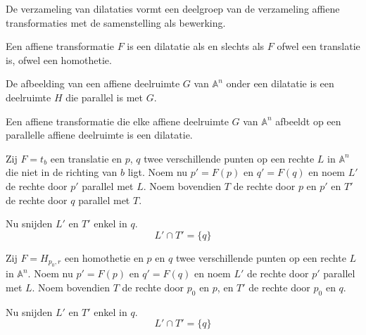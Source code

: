 \documentclass[main.tex]{subfiles}
\begin{document}
\begin{st}
  De verzameling van dilataties vormt een deelgroep van de verzameling affiene transformaties met de samenstelling als bewerking.
\end{st}

\begin{st}
  Een affiene transformatie $F$ is een dilatatie als en slechts als $F$ ofwel een translatie is, ofwel een homothetie.

\end{st}

\begin{st}
  De afbeelding van een affiene deelruimte $G$ van $\mathbb{A}^{n}$ onder een dilatatie is een deelruimte $H$ die parallel is met $G$.

\end{st}

\begin{st}
  Een affiene transformatie die elke affiene deelruimte $G$ van $\mathbb{A}^{n}$ afbeeldt op een parallelle affiene deelruimte is een dilatatie.

\end{st}

\begin{lem}
  Zij $F = t_{b}$ een translatie en $p$, $q$ twee verschillende punten op een rechte $L$ in $\mathbb{A}^{n}$ die niet in de richting van $b$ ligt.
  Noem nu $p' = F(p)$ en $q'= F(q)$ en noem $L'$ de rechte door $p'$ parallel met $L$.
  Noem bovendien $T$ de rechte door $p$ en $p'$ en $T'$ de rechte door $q$ parallel met $T$.

  Nu snijden $L'$ en $T'$ enkel in $q$.
  \[ L' \cap T' = \{q\} \]

\end{lem}

\begin{lem}
  Zij $F = H_{p_{0},r}$ een homothetie en $p$ en $q$ twee verschillende punten op een rechte $L$ in $\mathbb{A}^{n}$.
  Noem nu $p' = F(p)$ en $q'= F(q)$ en noem $L'$ de rechte door $p'$ parallel met $L$.
  Noem bovendien $T$ de rechte door $p_{0}$ en $p$, en $T'$ de rechte door $p_{0}$ en $q$.
  
  Nu snijden $L'$ en $T'$ enkel in $q$.
  \[ L' \cap T' = \{q\} \]

\end{lem}
\end{document}
